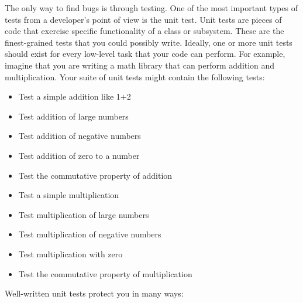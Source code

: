 
The only way to find bugs is through testing. One of the most important types of tests from a developer’s point of view is the unit test. Unit tests are pieces of code that exercise specific functionality of a class or subsystem. These are the finest-grained tests that you could possibly write. Ideally, one or more unit tests should exist for every low-level task that your code can perform. For example, imagine that you are writing a math library that can perform addition and multiplication. Your suite of unit tests might contain the following tests:

\begin{itemize}
\item
Test a simple addition like 1+2

\item
Test addition of large numbers

\item
Test addition of negative numbers

\item
Test addition of zero to a number

\item
Test the commutative property of addition

\item
Test a simple multiplication

\item
Test multiplication of large numbers

\item
Test multiplication of negative numbers

\item
Test multiplication with zero

\item
Test the commutative property of multiplication
\end{itemize}

Well-written unit tests protect you in many ways:

